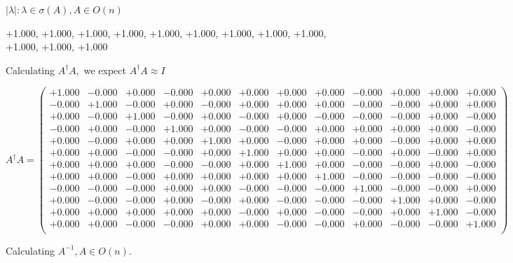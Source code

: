 \documentclass[9pt]{article}
\theoremstyle{plain}
\theoremstyle{definition}
\theoremstyle{remark}
\numberwithin{equation}{section}
\begin{document}
 $|\lambda | : \lambda \in \sigma(A) , A \in O(n)$

+1.000, +1.000, +1.000, +1.000, +1.000, +1.000, +1.000, +1.000, +1.000, +1.000, +1.000, +1.000


Calculating $A^{\dag} A,$  we expect $A^{\dag} A \approx I$

$A^{\dag} A = \left(
\begin{array}{
cccccccccccc}
+1.000 & -0.000 & +0.000 & -0.000 & +0.000 & +0.000 & +0.000 & +0.000 & -0.000 & +0.000 & +0.000 & +0.000 \\
-0.000 & +1.000 & -0.000 & +0.000 & -0.000 & +0.000 & +0.000 & +0.000 & -0.000 & -0.000 & +0.000 & +0.000 \\
+0.000 & -0.000 & +1.000 & -0.000 & +0.000 & -0.000 & +0.000 & -0.000 & -0.000 & -0.000 & +0.000 & -0.000 \\
-0.000 & +0.000 & -0.000 & +1.000 & +0.000 & -0.000 & -0.000 & +0.000 & +0.000 & +0.000 & +0.000 & -0.000 \\
+0.000 & -0.000 & +0.000 & +0.000 & +1.000 & +0.000 & -0.000 & +0.000 & +0.000 & -0.000 & +0.000 & +0.000 \\
+0.000 & +0.000 & -0.000 & -0.000 & +0.000 & +1.000 & +0.000 & +0.000 & -0.000 & +0.000 & -0.000 & +0.000 \\
+0.000 & +0.000 & +0.000 & -0.000 & -0.000 & +0.000 & +1.000 & +0.000 & -0.000 & -0.000 & +0.000 & -0.000 \\
+0.000 & +0.000 & -0.000 & +0.000 & +0.000 & +0.000 & +0.000 & +1.000 & -0.000 & -0.000 & -0.000 & -0.000 \\
-0.000 & -0.000 & -0.000 & +0.000 & +0.000 & -0.000 & -0.000 & -0.000 & +1.000 & -0.000 & -0.000 & +0.000 \\
+0.000 & -0.000 & -0.000 & +0.000 & -0.000 & +0.000 & -0.000 & -0.000 & -0.000 & +1.000 & +0.000 & -0.000 \\
+0.000 & +0.000 & +0.000 & +0.000 & +0.000 & -0.000 & +0.000 & -0.000 & -0.000 & +0.000 & +1.000 & -0.000 \\
+0.000 & +0.000 & -0.000 & -0.000 & +0.000 & +0.000 & -0.000 & -0.000 & +0.000 & -0.000 & -0.000 & +1.000 \\
\end{array}
\right)$ \newline 

Calculating $A^{-1} ,  A \in O(n)$.
\end{document}
